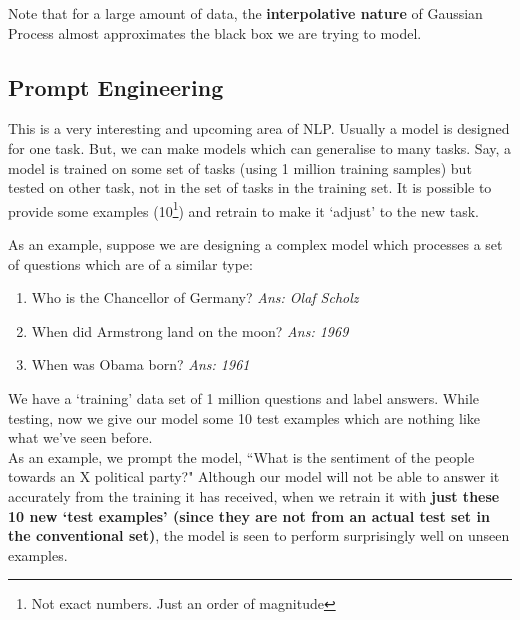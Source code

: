 \documentclass[12pt]{article}
\begin{document}
Note that for a large amount of data, the \textbf{interpolative nature} of Gaussian Process almost approximates the black box we are trying to model.

\subsection{Prompt Engineering}
This is a very interesting and upcoming area of NLP. Usually a model is designed for one task. But, we can make models which can generalise to many tasks. Say, a model is trained on some set of tasks (using 1 million training samples) but tested on other task, not in the set of tasks in the training set. It is possible to provide some examples (10\footnote{Not exact numbers. Just an order of magnitude}) and retrain to make it ‘adjust’ to the new task.

As an example, suppose we are designing a complex model which processes a set of questions which are of a similar type:
\begin{enumerate}
    \item Who is the Chancellor of Germany? \textit{Ans: Olaf Scholz}
    \item When did Armstrong land on the moon? \textit{Ans: 1969}
    \item When was Obama born? \textit{Ans: 1961}
\end{enumerate}
We have a `training' data set of 1 million questions and label answers. While testing, now we give our model some 10 test examples which are nothing like what we've seen before. \\
As an example, we prompt the model, ``What is the sentiment of the people towards an X political party?" 
Although our model will not be able to answer it accurately from the training it has received, when we retrain it with \textbf{just these 10 new `test examples' (since they are not from an actual test set in the conventional set)}, the model is seen to perform surprisingly well on unseen examples. 
\end{document}
